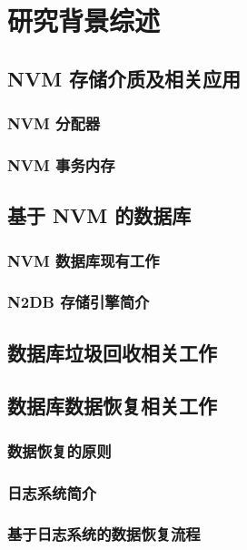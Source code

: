 
\chapter{研究背景综述}

\section{NVM 存储介质及相关应用}

\subsection{NVM 分配器}

\subsection{NVM 事务内存}

\section{基于 NVM 的数据库}

\subsection{NVM 数据库现有工作}

\subsection{N2DB 存储引擎简介}

\section{数据库垃圾回收相关工作}

\section{数据库数据恢复相关工作}

\subsection{数据恢复的原则}

\subsection{日志系统简介}

\subsection{基于日志系统的数据恢复流程}


